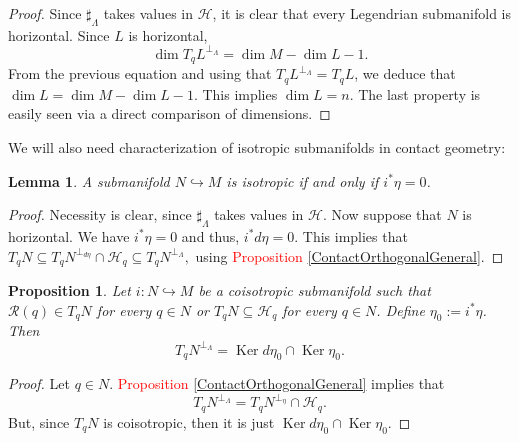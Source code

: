 \documentclass[12pt]{article}
\newtheorem{prop}{Proposition}[section]
\newtheorem{lemma}{Lemma}[section]
\renewcommand{\dim}{\operatorname{dim}}
\renewcommand{\ker}{\operatorname{Ker}}
\begin{document}
\begin{proof} Since $\sharp_\Lambda$ takes values in $\mathcal{H}$, it is clear that every Legendrian submanifold is horizontal. Since $L$ is horizontal, $$\dim T_qL^{\perp_\Lambda} = \dim M - \dim L - 1.$$ From the previous equation and using that $T_qL^{\perp_\Lambda} = T_qL$, we deduce that $\dim L = \dim M - \dim L - 1$. This implies $\dim L = n$. The last property is easily seen via a direct comparison of dimensions.
\end{proof}
We will also need characterization of isotropic submanifolds in contact geometry:
\begin{lemma} \label{isotropicClassificationContact} A submanifold $N \hookrightarrow M$ is isotropic if and only if $i^* \eta = 0$.
\end{lemma}
\begin{proof}Necessity is clear, since $\sharp_\Lambda$ takes values in $\mathcal{H}$. Now suppose that $N$ is horizontal. We have $i^*\eta = 0$ and thus, $i^* d\eta = 0$. This implies that $T_qN \subseteq T_qN^{\perp_{d\eta}} \cap \mathcal{H}_q \subseteq T_qN^{\perp_\Lambda},$ using \textcolor{red}{Proposition \ref{ContactOrthogonalGeneral}}.
\end{proof}	

\begin{prop} \label{ContactOrthogonalCoisotropic} Let $i:N \hookrightarrow M$ be a coisotropic submanifold such that $\mathcal{R}(q) \in T_qN$ for every $q\in N$ or $T_qN \subseteq \mathcal{H}_q$ for every $q \in N$. Define $\eta_0:= i^*\eta$. Then $$T_qN^{\perp_\Lambda} = \ker{ d\eta_0} \cap \ker \eta_0.$$
\end{prop}
\begin{proof} Let $q\in N$. \textcolor{red}{Proposition \ref{ContactOrthogonalGeneral}} implies that $$T_qN^{\perp_\Lambda} = T_qN^{\perp_\eta} \cap \mathcal{H}_q.$$ But, since $T_qN$ is coisotropic, then it is just $\ker d\eta_0 \cap \ker \eta_0.$ 
\end{proof}
\end{document}
